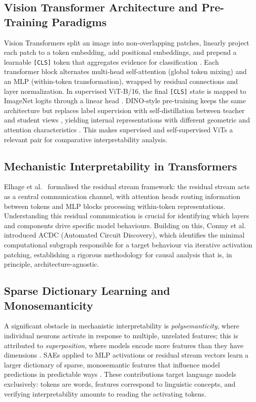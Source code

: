 \subsection{Vision Transformer Architecture and Pre-Training Paradigms}
Vision Transformers split an image into non-overlapping patches, linearly project each patch to a token embedding, add positional embeddings, and prepend a learnable \texttt{[CLS]} token that aggregates evidence for classification \cite{Dosovitskiy2021}. Each transformer block alternates multi-head self-attention (global token mixing) and an MLP (within-token transformation), wrapped by residual connections and layer normalization. In supervised ViT-B/16, the final \texttt{[CLS]} state is mapped to ImageNet logits through a linear head \cite{Dosovitskiy2021}. DINO-style pre-training keeps the same architecture but replaces label supervision with self-distillation between teacher and student views \cite{Caron2021}, yielding internal representations with different geometric and attention characteristics \cite{Raghu2021}. This makes supervised and self-supervised ViTs a relevant pair for comparative interpretability analysis.

\subsection{Mechanistic Interpretability in Transformers}
Elhage et al.\ \cite{Elhage2021} formalised the residual stream framework: the residual stream acts as a central communication channel, with attention heads routing information between tokens and MLP blocks processing within-token representations. Understanding this residual communication is crucial for identifying which layers and components drive specific model behaviours. Building on this, Conmy et al.\ \cite{Conmy2023} introduced ACDC (Automated Circuit Discovery), which identifies the minimal computational subgraph responsible for a target behaviour via iterative activation patching, establishing a rigorous methodology for causal analysis that is, in principle, architecture-agnostic.

\subsection{Sparse Dictionary Learning and Monosemanticity}
A significant obstacle in mechanistic interpretability is \textit{polysemanticity}, where individual neurons activate in response to multiple, unrelated features; this is attributed to \textit{superposition}, where models encode more features than they have dimensions \cite{Elhage2021}. SAEs applied to MLP activations or residual stream vectors learn a larger dictionary of sparse, monosemantic features that influence model predictions in predictable ways \cite{Cunningham2024, Bricken2023}. These contributions target language models exclusively: tokens are words, features correspond to linguistic concepts, and verifying interpretability amounts to reading the activating tokens.

